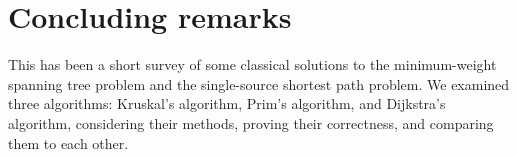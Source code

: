 \documentclass[11pt]{article}
\begin{document}
\section{Concluding remarks}

This has been a short survey of some classical solutions to the minimum-weight spanning tree problem and the single-source shortest path problem.
We examined three algorithms: Kruskal's algorithm, Prim's algorithm, and Dijkstra's algorithm, considering their methods, proving their correctness, and comparing them to each other.




\end{document}
